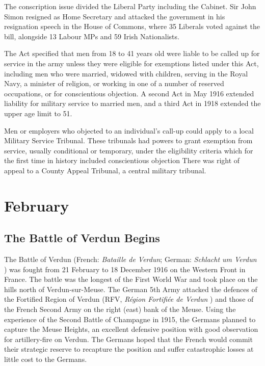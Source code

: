 \documentclass[a4paper,]{book}
\begin{document}
The conscription issue divided the Liberal Party including the Cabinet. Sir John Simon resigned as Home Secretary and attacked the government in his resignation speech in the House of Commons, where 35 Liberals voted against the bill, alongside 13 Labour MPs and 59 Irish Nationalists.

The Act specified that men from 18 to 41 years old were liable to be called up for service in the army unless they were eligible for exemptions listed under this Act, including men who were married, widowed with children, serving in the Royal Navy, a minister of religion, or working in one of a number of reserved occupations, or for conscientious objection. A second Act in May 1916 extended liability for military service to married men, and a third Act in 1918 extended the upper age limit to 51.

Men or employers who objected to an individual's call-up could apply to a local Military Service Tribunal. These tribunals had powers to grant exemption from service, usually conditional or temporary, under the eligibility criteria which for the first time in history included conscientious objection There was right of appeal to a County Appeal Tribunal, a central military tribunal. 


\chapter{February}

\section{The Battle of Verdun Begins}

The Battle of Verdun (French: \textit{Bataille de Verdun}; German: \textit{Schlacht um Verdun} ) was fought from 21 February to 18 December 1916 on the Western Front in France. The battle was the longest of the First World War and took place on the hills north of Verdun-sur-Meuse. The German 5th Army attacked the defences of the Fortified Region of Verdun (RFV, \textit{Région Fortifiée de Verdun} ) and those of the French Second Army on the right (east) bank of the Meuse. Using the experience of the Second Battle of Champagne in 1915, the Germans planned to capture the Meuse Heights, an excellent defensive position with good observation for artillery-fire on Verdun. The Germans hoped that the French would commit their strategic reserve to recapture the position and suffer catastrophic losses at little cost to the Germans.
\end{document}
